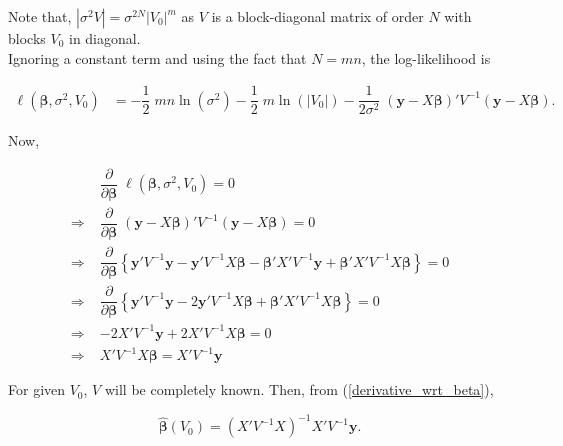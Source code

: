 \documentclass[11pt, a4paper]{article}
\begin{document}
\vspace{0.5cm}

Note that, $\left| \sigma^2 V \right| = \sigma^{2N} \left| V_0 \right|^m$ as $V$ is a block-diagonal matrix of order $N$ with blocks $V_0$ in diagonal. \\[1em]

Ignoring a constant term and using the fact that $N = mn$, the log-likelihood is

\begin{align}\label{log_likelihood}
\ell(\boldsymbol{\beta}, \sigma^2, V_0) &= -\dfrac{1}{2} \; mn \ln(\sigma^2) - \dfrac{1}{2} \; m \ln(\left| V_0 \right|) - \dfrac{1}{2\sigma^2} \; (\boldsymbol{y} - X\boldsymbol{\beta})' V^{-1} (\boldsymbol{y} - X\boldsymbol{\beta}).
\end{align}

Now,

\begin{align}\label{derivative_wrt_beta}
&\dfrac{\partial}{\partial \boldsymbol{\beta}} \; \ell(\boldsymbol{\beta}, \sigma^2, V_0) = 0 \nonumber \\[0.5em]
\Rightarrow \; &\dfrac{\partial}{\partial \boldsymbol{\beta}} \; (\boldsymbol{y} - X\boldsymbol{\beta})' V^{-1} (\boldsymbol{y} - X\boldsymbol{\beta}) = 0 \nonumber \\[0.5em]
\Rightarrow \; &\dfrac{\partial}{\partial \boldsymbol{\beta}} \left\{\boldsymbol{y}' V^{-1} \boldsymbol{y} - \boldsymbol{y}' V^{-1} X \boldsymbol{\beta} - \boldsymbol{\beta}' X' V^{-1} \boldsymbol{y} + \boldsymbol{\beta}' X' V^{-1} X \boldsymbol{\beta} \right\} = 0 \nonumber \\[0.5em]
\Rightarrow \; &\dfrac{\partial}{\partial \boldsymbol{\beta}} \left\{ \boldsymbol{y}' V^{-1} \boldsymbol{y} - 2 \boldsymbol{y}' V^{-1} X \boldsymbol{\beta} + \boldsymbol{\beta}' X' V^{-1} X \boldsymbol{\beta} \right\} = 0 \nonumber \\[0.5em]
\Rightarrow \; &-2X'V^{-1}\boldsymbol{y} + 2 X' V^{-1} X \boldsymbol{\beta} = 0 \nonumber \\[0.5em]
\Rightarrow \; &X' V^{-1} X \boldsymbol{\beta} = X'V^{-1}\boldsymbol{y}
\end{align}

For given $V_0$, $V$ will be completely known. Then, from (\ref{derivative_wrt_beta}),

\begin{equation}\label{beta_hat}
\widehat{\boldsymbol{\beta}}(V_0) = (X'V^{-1}X)^{-1}X'V^{-1}\boldsymbol{y}.
\end{equation}
\end{document}
